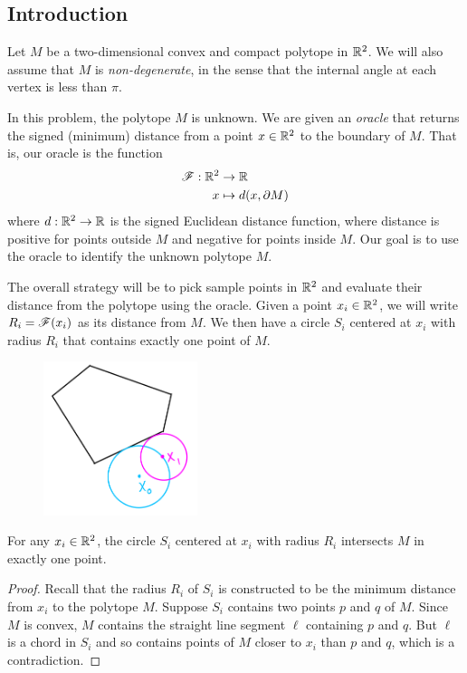 \documentclass[12pt]{article}
\begin{document}
\begin{flushleft}

\setlength{\parindent}{30pt}




\section{Introduction} 

Let $M$ be a two-dimensional convex and compact polytope in $\mathbb{R}^2$.
We will also assume that $M$ is \textit{non-degenerate}, in the sense that the internal angle at each vertex is less than $\pi$.

In this problem, the polytope $M$ is unknown.
We are given an \textit{oracle} that returns the signed (minimum) distance from a point $x\in\mathbb{R}^2$ to the boundary of $M$.
That is, our oracle is the function
\begin{align*}
	\mathscr{F}: \mathbb{R}^2 &\to \mathbb{R}\\
	x &\mapsto d(x,\partial M)
\end{align*}
where $d:\mathbb{R}^2\to \mathbb{R}$ is the signed Euclidean distance function, where distance is positive for points outside $M$ and negative for points inside $M$.
Our goal is to use the oracle to identify the unknown polytope $M$.

The overall strategy will be to pick sample points in $\mathbb{R}^2$ and evaluate their distance from the polytope using the oracle.
Given a point $x_i\in\mathbb{R}^2$, we will write $R_i=\mathscr{F}(x_i)$ as its distance from $M$.
We then have a circle $S_i$ centered at $x_i$ with radius $R_i$ that contains exactly one point of $M$.

\begin{figure}[H]
	\centering
	\includegraphics[width=0.4\textwidth]{1.png}
\end{figure}

\begin{prop}{1}
	For any $x_i\in\mathbb{R}^2$, the circle $S_i$ centered at $x_i$ with radius $R_i$ intersects $M$ in exactly one point.
\end{prop}
\begin{proof}
	Recall that the radius $R_i$ of $S_i$ is constructed to be the minimum distance from $x_i$ to the polytope $M$.
	Suppose $S_i$ contains two points $p$ and $q$ of $M$.
	Since $M$ is convex, $M$ contains the straight line segment $\ell$ containing $p$ and $q$.
	But $\ell$ is a chord in $S_i$ and so contains points of $M$ closer to $x_i$ than $p$ and $q$, which is a contradiction.
\end{proof}



\end{flushleft}
\end{document}
